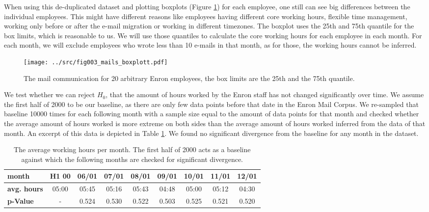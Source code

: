 \documentclass{article}
\begin{document}
When using this de-duplicated dataset and plotting boxplots (Figure
\ref{fig:mailboxplot}) for each employee, one still can see big differences
between the individual employees. This might have different reasons like
employees having different core working hours, flexible time management, working
only before or after the e-mail migration or working in different timezones. The
boxplot uses the 25th and 75th quantile for the box limits, which is reasonable
to us. We will use those quantiles to calculate the core working hours for each
employee in each month. For each month, we will exclude employees who wrote less
than 10 e-mails in that month, as for those, the working hours cannot be
inferred. 

\begin{figure}
  \centering
  \texttt{[image: ../src/fig003\_mails\_boxplott.pdf]}
   \caption{The mail communication for 20 arbitrary Enron employees, the box
   limits are the 25th and the 75th quantile.}
  \label{fig:mailboxplot}
\end{figure}

We test whether we can reject $H_0$, that the amount of hours worked by
the Enron staff has not changed significantly over time. We assume the first
half of 2000 to be our baseline, as there are only few data points before that
date in the Enron Mail Corpus. We re-sampled that baseline 10000 times for each
following month with a sample size equal to the amount of data points for that
month and checked whether the average amount of hours worked is more extreme on
both sides than the average amount of hours worked inferred from the data of
that month. An excerpt of this data is depicted in Table \ref{ta:pvalues}. We
found no significant divergence from the baseline for any month in the dataset.

\begin{table}
  \caption{The average working hours per month. The first half of 2000 acts as a
  baseline against which the following months are checked for significant
  divergence.}
  \centering
  \begin{tabular}{lcccccccc}
    \toprule
    \textbf{month} & H1 00 & 06/01 & 07/01 & 08/01 & 09/01 & 10/01 & 11/01 &
    12/01 \\
    \midrule
    \textbf{avg. hours} & 05:00 & 05:45 & 05:16 & 05:43 & 04:48 & 05:00 & 05:12
    & 04:30 \\
    \textbf{p-Value} & - & 0.524 & 0.530 & 0.522 & 0.503 & 0.525 & 0.521 & 0.520
    \\
    \bottomrule
  \end{tabular}
  \label{ta:pvalues}
  \vspace{-4mm}
\end{table}
\end{document}

